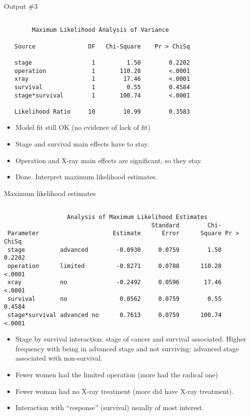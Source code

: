 \documentclass[pdf]{prosper}
\begin{document}
\begin{slide}{Output \#3}

{\scriptsize
\begin{verbatim}

        Maximum Likelihood Analysis of Variance

   Source               DF   Chi-Square    Pr > ChiSq

   stage                 1         1.50        0.2202
   operation             1       110.28        <.0001
   xray                  1        17.46        <.0001
   survival              1         0.55        0.4584
   stage*survival        1       100.74        <.0001

   Likelihood Ratio     10        10.99        0.3583

\end{verbatim}
}

\begin{itemize}
\item Model fit still OK (no evidence of lack of fit)
\item Stage and survival main effects have to stay.
\item Operation and X-ray main effects are significant, so they stay.
\item Done. Interpret maximum likelihood estimates.
\end{itemize}
  
\end{slide}

\begin{slide}{Maximum likelihood estimates}
  {\scriptsize
\begin{verbatim}

                  Analysis of Maximum Likelihood Estimates
                                          Standard        Chi-
 Parameter                     Estimate      Error      Square Pr > ChiSq
 stage          advanced        -0.0930     0.0759        1.50    0.2202
 operation      limited         -0.8271     0.0788      110.28    <.0001
 xray           no              -0.2492     0.0596       17.46    <.0001
 survival       no               0.0562     0.0759        0.55    0.4584
 stage*survival advanced no      0.7613     0.0759      100.74    <.0001
\end{verbatim}
}

\begin{itemize}
\item Stage by survival interaction: stage of cancer and survival
  associated. Higher frequency with being in
  advanced stage and not surviving: advanced stage associated
  with non-survival.
\item Fewer women had the limited operation (more had the radical one)
\item Fewer woman had no X-ray treatment (more did have X-ray treatment).
\item Interaction with ``response'' (survival) usually of most interest.
\end{itemize}

\end{slide}
\end{document}
